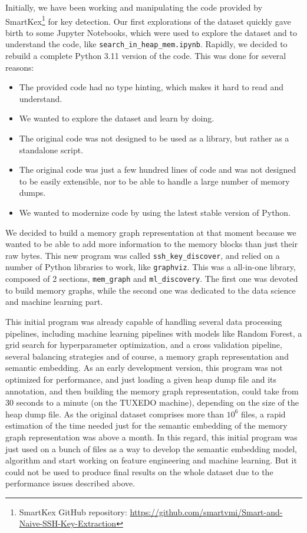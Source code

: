 Initially, we have been working and manipulating the code provided by SmartKex\footnote{SmartKex GitHub repository: \url{https://github.com/smartvmi/Smart-and-Naive-SSH-Key-Extraction}} for key detection. Our first explorations of the dataset quickly gave birth to some Jupyter Notebooks, which were used to explore the dataset and to understand the code, like \texttt{search\_in\_heap\_mem.ipynb}. Rapidly, we decided to rebuild a complete Python 3.11 version of the code. This was done for several reasons:

\begin{itemize}
    \item The provided code had no type hinting, which makes it hard to read and understand.
    \item We wanted to explore the dataset and learn by doing.
    \item The original code was not designed to be used as a library, but rather as a standalone script.
    \item The original code was just a few hundred lines of code and was not designed to be easily extensible, nor to be able to handle a large number of memory dumps.
    \item We wanted to modernize code by using the latest stable version of Python.
\end{itemize}

We decided to build a memory graph representation at that moment because we wanted to be able to add more information to the memory blocks than just their raw bytes. This new program was called \texttt{ssh\_key\_discover}, and relied on a number of Python libraries to work, like \texttt{graphviz}. This was a all-in-one library, composed of 2 sections, \texttt{mem\_graph} and \texttt{ml\_discovery}. The first one was devoted to build memory graphs, while the second one was dedicated to the data science and machine learning part.

This initial program was already capable of handling several data processing pipelines, including machine learning pipelines with models like Random Forest, a grid search for hyperparameter optimization, and a cross validation pipeline, several balancing strategies and of course, a memory graph representation and semantic embedding. As an early development version, this program was not optimized for performance, and just loading a given heap dump file and its annotation, and then building the memory graph representation, could take from 30 seconds to a minute (on the TUXEDO machine), depending on the size of the heap dump file. As the original dataset comprises more than $ 10^{6} $ files, a rapid estimation of the time needed just for the semantic embedding of the memory graph representation was above a month. In this regard, this initial program was just used on a bunch of files as a way to develop the semantic embedding model, algorithm and start working on feature engineering and machine learning. But it could not be used to produce final results on the whole dataset due to the performance issues described above.

